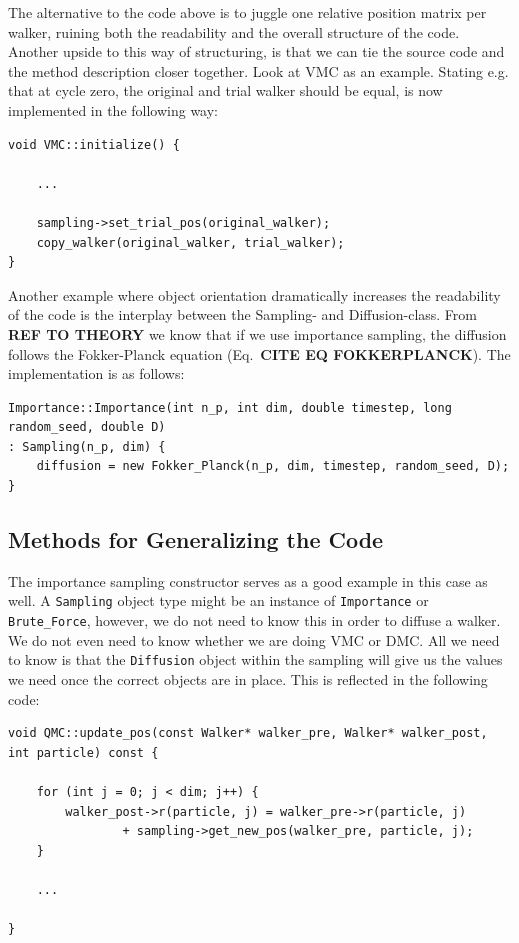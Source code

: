 The alternative to the code above is to juggle one relative position matrix per walker, ruining both the readability and the overall structure of the code. Another upside to this way of structuring, is that we can tie the source code and the method description closer together. Look at VMC as an example. Stating e.g. that at cycle zero, the original and trial walker should be equal, is now implemented in the following way:

\vspace{0.5cm}
\begin{lstlisting}
void VMC::initialize() {
    
    ...

    sampling->set_trial_pos(original_walker);
    copy_walker(original_walker, trial_walker);
}

\end{lstlisting}

Another example where object orientation dramatically increases the readability of the code is the interplay between the Sampling- and Diffusion-class. From \textbf{REF TO THEORY} we know that if we use importance sampling, the diffusion follows the Fokker-Planck equation (Eq.~\textbf{CITE EQ FOKKERPLANCK}). The implementation is as follows:

\vspace{0.5cm}
\begin{lstlisting}
Importance::Importance(int n_p, int dim, double timestep, long random_seed, double D)
: Sampling(n_p, dim) {
    diffusion = new Fokker_Planck(n_p, dim, timestep, random_seed, D);
}
\end{lstlisting}


\subsection{Methods for Generalizing the Code}

The importance sampling constructor serves as a good example in this case as well. A \verb+Sampling+ object type might be an instance of \verb+Importance+ or \verb+Brute_Force+, however, we do not need to know this in order to diffuse a walker. We do not even need to know whether we are doing VMC or DMC. All we need to know is that the \verb+Diffusion+ object within the sampling will give us the values we need once the correct objects are in place. This is reflected in the following code:

\vspace{0.5cm}
\begin{lstlisting}
void QMC::update_pos(const Walker* walker_pre, Walker* walker_post, int particle) const {

    for (int j = 0; j < dim; j++) {
        walker_post->r(particle, j) = walker_pre->r(particle, j)
                + sampling->get_new_pos(walker_pre, particle, j);
    }
    
    ...
    
}
\end{lstlisting}

